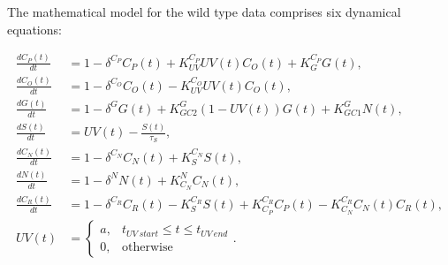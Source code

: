\documentclass[
  10pt,
  onecolumn]{article}
\begin{document}
The mathematical model for the wild type data comprises six dynamical
equations:

\begin{align*}
\frac{d C_P(t)}{dt} &= 1 - \delta^{C_P} C_P(t) + K_{UV}^{C_P} UV(t) C_O(t)  + K_{G}^{C_P} G(t) , \\
\frac{dC_O(t)}{dt} &= 1 - \delta^{C_O} C_O(t) - K_{UV}^{C_O} UV(t) C_O(t), \\
\frac{dG(t)}{dt} &= 1 - \delta^{G} G(t) + K_{GC2}^G \left(1 - UV(t)\right) G(t) + K_{GC1}^G N(t) , \\
\frac{dS(t)}{dt} &= UV(t) - \frac{S(t)}{\tau_S}, \\
\frac{dC_N(t)}{dt} &= 1 - \delta^{C_N} C_N(t) + K_{S}^{C_N} S(t), \\
\frac{dN(t)}{dt} &= 1 - \delta^{N} N(t) + K_{C_N}^{N} C_N(t), \\
\frac{dC_R(t)}{dt} &= 1 - \delta^{C_R} C_R(t) - K_{S}^{C_R} S(t) + K_{C_P}^{C_R} C_P(t) - K_{C_N}^{C_R} C_N(t) C_R(t), \\
UV(t) &=
    \begin{cases}
        a, & t_{UV\: start} \leq t \leq t_{UV\: end}\\
        0, & \text{otherwise}
    \end{cases}   .
\end{align*}
\end{document}

